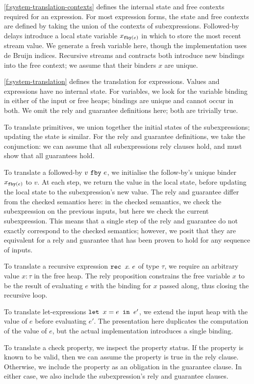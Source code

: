 \documentclass[a4paper,UKenglish,cleveref, autoref, thm-restate,anonymous]{lipics-v2021}
\begin{document}
\autoref{f:system-translation-contexts} defines the internal state and free contexts required for an expression.
For most expression forms, the state and free contexts are defined by taking the union of the contexts of subexpressions.
Followed-by delays introduce a local state variable $x_{\tt{fby}(e)}$ in which to store the most recent stream value.
We generate a fresh variable here, though the implementation uses de Bruijn indices.
Recursive streams and contracts both introduce new bindings into the free context; we assume that their binders $x$ are unique.

\autoref{f:system-translation} defines the translation for expressions.
Values and expressions have no internal state.
For variables, we look for the variable binding in either of the input or free heaps; bindings are unique and cannot occur in both.
We omit the rely and guarantee definitions here; both are trivially true.

To translate primitives, we union together the initial states of the subexpressions; updating the state is similar.
For the rely and guarantee definitions, we take the conjunction: we can assume that all subexpressions rely clauses hold, and must show that all guarantees hold.

To translate a followed-by $\xfby{v}{e}$, we initialise the follow-by's unique binder $x_{\tt{fby}(e)}$ to $v$.
At each step, we return the value in the local state, before updating the local state to the subexpression's new value.
The rely and guarantee differ from the checked semantics here: in the checked semantics, we check the subexpression on the previous inputs, but here we check the current subexpression.
This means that a single step of the rely and guarantee do not exactly correspond to the checked semantics; however, we posit that they are equivalent for a rely and guarantee that has been proven to hold for any sequence of inputs.

To translate a recursive expression $\xrec{x}{e}$ of type $\tau$, we require an arbitrary value $x: \tau$ in the free heap.
The rely proposition constrains the free variable $x$ to be the result of evaluating $e$ with the binding for $x$ passed along, thus closing the recursive loop.

To translate let-expressions $\xlet{x}{e}{e'}$, we extend the input heap with the value of $e$ before evaluating $e'$.
The presentation here duplicates the computation of the value of $e$, but the actual implementation introduces a single binding.

To translate a check property, we inspect the property status.
If the property is known to be valid, then we can assume the property is true in the rely clause.
Otherwise, we include the property as an obligation in the guarantee clause.
In either case, we also include the subexpression's rely and guarantee clauses.
\end{document}
